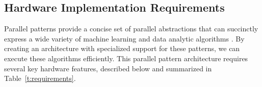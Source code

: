 

\subsection{Hardware Implementation Requirements}
Parallel patterns provide a concise set of parallel abstractions that can succinctly express a wide variety of 
machine learning and data analytic algorithms \cite{ecoop13sujeeth, pldi13halide, catanzaro11copperhead, delite2maxj}.
By creating an architecture with specialized support for these patterns, we can execute these algorithms efficiently.
This parallel pattern architecture requires several key hardware features, described below and summarized in Table~\ref{t:requirements}.


